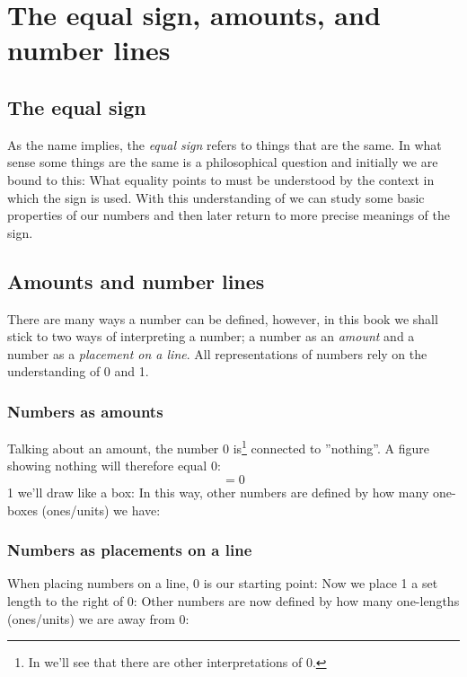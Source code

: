 



\newpage
\section{The equal sign, amounts, and number lines}
\subsection*{The equal sign}
As the name implies, the \textit{equal sign}  \sym{$ = $} refers to things that are the same. In what sense some things are the same is a philosophical question and initially we are bound to this: What equality \sym{$=$} points to must be understood by the context in which the sign is used. With this understanding of \sym{=} we can study some basic properties of our numbers and then later return to more precise meanings of the sign. \regv
{}
\subsection*{Amounts and number lines}
There are many ways a number can be defined, however, in this book we shall stick to two ways of interpreting a number; a number as an \textsl{amount} and a number as a \textsl{placement on a line}. All representations of numbers rely on the understanding of 0 and 1.

\subsubsection*{Numbers as amounts}
	Talking about an amount, the number 0 is\footnote{In  we'll see that there are other interpretations of 0.} connected to ''nothing''. A figure showing nothing will therefore equal 0:
	\[ =0 \]
	1 we'll draw like a box:
In this way, other numbers are defined by how many one-boxes (ones/units) we have:
\newpage	
\subsubsection*{Numbers as placements on a line}
	When placing numbers on a line, 0 is our starting point:
	Now we place 1 a set length to the right of 0:
	Other numbers are now defined by how many one-lengths (ones/units) we are away from 0:
